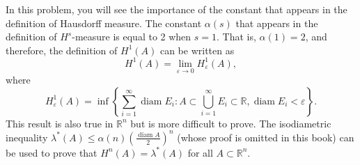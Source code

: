 \documentclass[../main.tex]{subfiles}
\begin{document}
\begin{remark}{}{}
In this problem, you will see the importance of the constant that appears in the definition of Hausdorff measure. The constant $\alpha(s)$ that appears in the definition of $H^s$-measure is equal to 2 when $s = 1$. That is, $\alpha(1) = 2$, and therefore, the definition of $H^1(A)$ can be written as
\[
H^1(A) = \lim_{\varepsilon\to 0} H_{\varepsilon}^1(A),
\]
where
\[
H_{\varepsilon}^1(A) = \inf \left\{ \sum_{i=1}^{\infty} \operatorname{diam} E_i : A \subset \bigcup_{i=1}^{\infty} E_i \subset \mathbb{R}, \operatorname{diam} E_i < \varepsilon \right\}.
\]
This result is also true in $\mathbb{R}^n$ but is more difficult to prove. The isodiametric inequality $\lambda^*(A) \le \alpha(n) \left(\frac{\operatorname{diam} A}{2}\right)^n$ (whose proof is omitted in this book) can be used to prove that $H^n(A) = \lambda^*(A)$ for all $A \subset \mathbb{R}^n$.
\end{remark}
\end{document}

